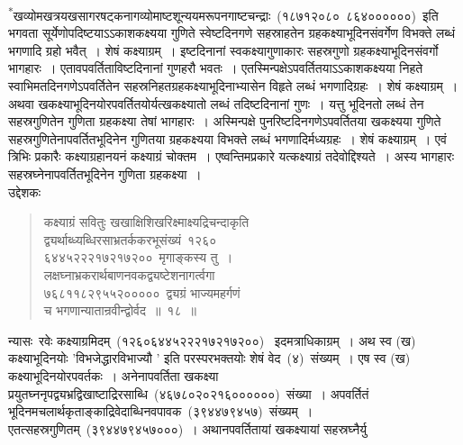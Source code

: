 \documentclass[11pt, openany]{book}
\begin{document}
\newpage
\thispagestyle{fancy}
\fancyhf{}
\indent
\textsuperscript{*}खव्योमखत्रयखसागरषट्कनागव्योमाष्टशून्ययमरूपनगाष्टचन्द्राः~(१८७१२०८०\textendash\ ८६४००००००)~इति भगवता सूर्येणोपदिष्टयाऽऽकाशकक्ष्यया गुणिते स्वेष्टदिनगणे सहस्राहतेन ग्रहकक्ष्याभूदिनसंवर्गेण विभक्ते लब्धं भगणादि ग्रहो भवैत्~। शेषं कक्ष्याग्रम्~। इष्टदिनानां स्वकक्ष्यागुणाकारः सहस्रगुणो ग्रहकक्ष्याभूदिनसंवर्गो भागहारः~। एतावपवर्तिताविष्टदिनानां गुणहरौ भवतः~। एतस्मिन्पक्षेऽपवर्तितयाऽऽकाशकक्ष्यया निहते स्वाभिमतदिनगणेऽपवर्तितेन
सहस्रनिहतग्रहकक्ष्याभूदिनाभ्यासेन विहृते लब्धं भगणादिग्रहः~। शेषं कक्ष्याग्रम्~। अथवा
खकक्ष्याभूदिनयोरपवर्तितयोर्यत्खकक्ष्यातो लब्धं तदिष्टदिनानां गुणः~। यत्तु भूदिनतो लब्धं तेन सहस्रगुणितेन गुणिता ग्रहकक्ष्या तेषां भागहारः~। अस्मिन्पक्षे पुनरिष्टदिनगणेऽपवर्तितया खकक्ष्यया गुणिते सहस्रगुणितेनापवर्तितभूदिनेन गुणितया ग्रहकक्ष्यया विभक्ते लब्धं भगणादिर्मध्यग्रहः~। शेषं कक्ष्याग्रम्~। एवं त्रिभिः प्रकारैः कक्ष्याग्रहानयनं कक्ष्याग्रं चोक्तम~। एष्वन्तिमप्रकारे यत्कक्ष्याग्रं तदेवोद्दिश्यते~। अस्य भागहारः सहस्रघ्नेनापवर्तितभूदिनेन गुणिता ग्रहकक्ष्या~। \\
उद्देशकः \textendash
\begin{quote}
{\ku कक्ष्याग्रं सवितुः खखाक्षिशिखरिक्ष्माक्ष्यद्रिचन्दाकृति\\
द्व्यर्थाब्ध्यब्धिरसाभ्रतर्ककरभूसंख्यं~१२६०\textendash\\
६४४५२२२१७२१७२००~मृगाङ्कस्य तु~।\\
लक्षघ्नाभ्रकरार्थबाणनवकद्व्यष्टेशनागर्त्वगा\\
७६८११८२९५५२०००००~द्व्यग्रं भाज्यमहर्गणं\\
च भगणान्यातान्रवीन्द्वोर्वद~॥~१८~॥}
\end{quote}
\indent
न्यासः\textendash\ रवेः कक्ष्याग्रमिदम्~(१२६०६४४५२२२१७२१७२००)~ इदमत्राधिकाग्रम्~। अथ स्व (ख) कक्ष्याभूदिनयोः 'विभजेद्धारविभाज्यौ ' इति परस्परभक्तयोः शेषं वेद~(४)~संख्यम्~। एष स्व (ख) कक्ष्याभूदिनयोरपवर्तकः~। अनेनापवर्तिता खकक्ष्या प्रयुतघ्ननृपद्व्यभ्रद्विखाष्टाद्रिरसाब्धि~(४६७८०२०२१६००००००)~संख्या~। अपवर्तितं भूदिनमचलार्थकृताङ्काद्रिवेदाब्धिनवपावक~(३९४४७९४५७)~संख्यम्~।एतत्सहस्रगुणितम्~(३९४४७९४५७०००)~। अथानपवर्तितायां खकक्ष्यायां सहस्रघ्नैर्यु\textendash

\end{document}
